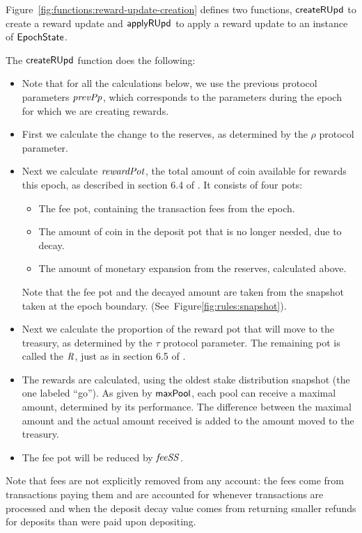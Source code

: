 \clearpage

Figure~\ref{fig:functions:reward-update-creation} defines two functions,
$\mathsf{createRUpd}$ to create a reward update and $\mathsf{applyRUpd}$ to apply a
reward update to an instance of $\mathsf{EpochState}$.

The $\mathsf{createRUpd}$ function does the following:
\begin{itemize}
  \item Note that for all the calculations below, we use the previous protocol parameters
    $\mathit{prevPp}$, which corresponds to the parameters during the epoch for which we
    are creating rewards.
  \item First we calculate the change to the reserves,
    as determined by the $\rho$ protocol parameter.
  \item Next we calculate $\mathit{rewardPot}$, the total amount of coin available for rewards this
    epoch, as described in section 6.4 of \cite{delegation_design}. It consists of four pots:
    \begin{itemize}
      \item The fee pot, containing the transaction fees from the epoch.
      \item The amount of coin in the deposit pot that is no longer needed, due to decay.
      \item The amount of monetary expansion from the reserves, calculated above.
    \end{itemize}
    Note that the fee pot and the decayed amount are taken from the snapshot taken at the
    epoch boundary.  (See~Figure\ref{fig:rules:snapshot}).
  \item Next we calculate the proportion of the reward pot that will move to the treasury,
    as determined by the $\tau$ protocol parameter. The remaining pot is called the
    $\mathit{R}$, just as in section 6.5 of \cite{delegation_design}.
  \item The rewards are calculated, using the oldest stake distribution snapshot (the one
    labeled ``go'').
    As given by $\mathsf{maxPool}$, each pool can receive a maximal amount, determined by its
    performance.  The difference between the maximal amount and the actual amount received is
    added to the amount moved to the treasury.
  \item The fee pot will be reduced by $\mathit{feeSS}$.
\end{itemize}

Note that fees are not explicitly removed from any account:
the fees come from transactions paying them and are accounted for whenever
transactions are processed and when the deposit decay value comes from returning
smaller refunds for deposits than were paid upon depositing.

